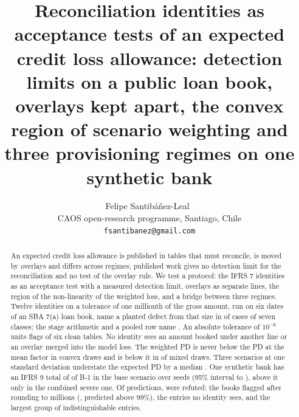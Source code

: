 \documentclass[11pt]{article}
\title{Reconciliation identities as acceptance tests of an expected credit loss allowance: detection limits on a public loan book, overlays kept apart, the convex region of scenario weighting and three provisioning regimes on one synthetic bank}
\author{Felipe Santib\'a\~nez-Leal~\orcidlink{0000-0002-0150-3246}\\
\small CAOS open-research programme, Santiago, Chile\\
\small \texttt{fsantibanez@gmail.com}}
\date{\docdate}
\begin{document}
\maketitle
\headerblock

\begin{abstract}
An expected credit loss allowance is published in tables that must reconcile, is moved by overlays and differs across regimes; published work gives no detection limit for the reconciliation and no test of the overlay rule.
We test a protocol: the IFRS 7 identities as an acceptance test with a measured detection limit, overlays as separate lines, the region of the non-linearity of the weighted loss, and a bridge between three regimes.
Twelve identities on a tolerance of one millionth of the gross amount, run on six dates of an SBA 7(a) loan book, name a planted defect from that size in \eoneAboveFullK{} of \eoneAboveFullN{} cases of seven classes; the stage arithmetic and a pooled row name \eoneAboveStageK{}.
An absolute tolerance of $10^{-6}$ units flags \etwoAbsCommittedK{} of six clean tables.
No identity sees an amount booked under another line or an overlay merged into the model loss.
The weighted PD is never below the PD at the mean factor in \efourConvexN{} convex draws and is below it in \efourMixedNeg{} of \efourMixedN{} mixed draws.
Three scenarios at one standard deviation understate the expected PD by a median \efourAdhocMed{}.
One synthetic bank has an IFRS 9 total of \efiveBaseMean{} of B-1 in the base scenario over \efiveSeeds{} seeds (95\% interval \efiveBaseLo{} to \efiveBaseHi{}), above it only in the combined severe one.
Of \hypTotal{} predictions, \hypRefuted{} were refuted: the books flagged after rounding to millions (\etwoRoundMillionPct{}, predicted above 99\%), the entries no identity sees, and the largest group of indistinguishable entries.
\end{abstract}
















\end{document}
